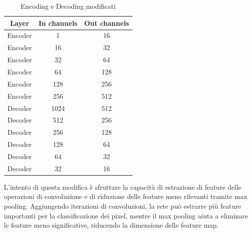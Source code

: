 \begin{table}[!ht]
    \centering
    \begin{tabular}{|c|c|c|}
        \hline
        \textbf{Layer} & \textbf{In channels} & \textbf{Out channels} \\
        \hline
        \hline
        Encoder        & 1                    & 16                    \\
        \hline
        Encoder        & 16                   & 32                    \\
        \hline
        Encoder        & 32                   & 64                    \\
        \hline
        Encoder        & 64                   & 128                   \\
        \hline
        Encoder        & 128                  & 256                   \\
        \hline
        Encoder        & 256                  & 512                   \\
        \hline
        Decoder        & 1024                 & 512                   \\
        \hline
        Decoder        & 512                  & 256                   \\
        \hline
        Decoder        & 256                  & 128                   \\
        \hline
        Decoder        & 128                  & 64                    \\
        \hline
        Decoder        & 64                   & 32                    \\
        \hline
        Decoder        & 32                   & 16                    \\
        \hline
    \end{tabular}
    \caption{Encoding e Decoding modificati}
    \label{tab:encoding_modificato}
\end{table}

L'intento di questa modifica è sfruttare la capacità di estrazione di feature delle operazioni di
convoluzione e di riduzione delle feature meno rilevanti tramite max pooling. Aggiungendo iterazioni
di convoluzioni, la rete può estrarre più feature importanti per la classificazione dei pixel,
mentre il max pooling aiuta a eliminare le feature meno significative, riducendo la dimensione delle
feature map.



